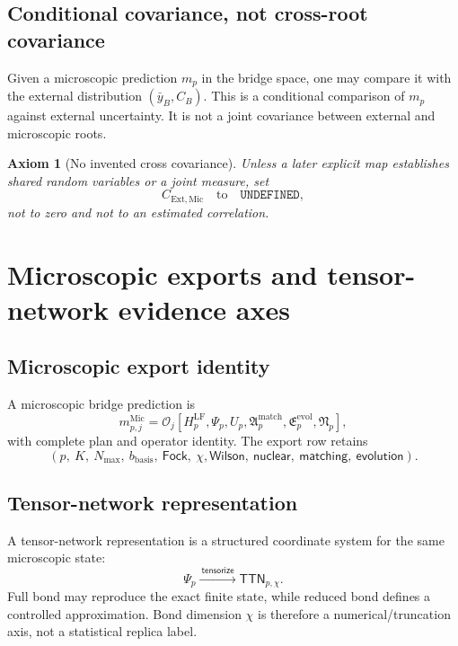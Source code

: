 \documentclass[11pt]{article}
\newtheorem{axiom}[definition]{Axiom}
\newcommand{\LF}{\ensuremath{\mathrm{LF}}}
\newcommand{\cO}{\mathcal O}
\newcommand{\Ext}{\ensuremath{\mathrm{Ext}}}
\newcommand{\Mic}{\ensuremath{\mathrm{Mic}}}
\begin{document}
\subsection{Conditional covariance, not cross-root covariance}

Given a microscopic prediction \(m_p\) in the bridge space, one may compare it with the external distribution \((\bar y_B,C_B)\).  This is a conditional comparison of \(m_p\) against external uncertainty.  It is not a joint covariance between external and microscopic roots.

\begin{axiom}[No invented cross covariance]
Unless a later explicit map establishes shared random variables or a joint measure, set
\begin{equation}
 C_{\Ext,\Mic}
 \quad\text{to}\quad
 \texttt{UNDEFINED},
 \label{eq:undefined-crosscov}
\end{equation}
not to zero and not to an estimated correlation.
\end{axiom}

\section{Microscopic exports and tensor-network evidence axes}
\label{sec:micro-export}

\subsection{Microscopic export identity}

A microscopic bridge prediction is
\begin{equation}
 m_{p,j}^{\Mic}
 =
 \cO_j
 \left[
 H_p^{\LF},\Psi_p,U_p,
 \mathfrak A_p^{\mathrm{match}},
 \mathfrak E_p^{\mathrm{evol}},
 \mathfrak N_p
 \right],
 \label{eq:micro-prediction}
\end{equation}
with complete plan and operator identity.  The export row retains
\begin{equation}
 \left(
 p,\ K,\ N_{\max},\ b_{\mathrm{basis}},\ \mathsf{Fock},\ \chi,
 \mathsf{Wilson},\ \mathsf{nuclear},\ \mathsf{matching},\ \mathsf{evolution}
 \right).
 \label{eq:micro-export-id}
\end{equation}

\subsection{Tensor-network representation}

A tensor-network representation is a structured coordinate system for the same microscopic state:
\begin{equation}
 \Psi_p
 \xrightarrow{\ \mathsf{tensorize}\ }
 \mathsf{TTN}_{p,\chi}.
 \label{eq:ttn-map}
\end{equation}
Full bond may reproduce the exact finite state, while reduced bond defines a controlled approximation.  Bond dimension \(\chi\) is therefore a numerical/truncation axis, not a statistical replica label.
\end{document}
